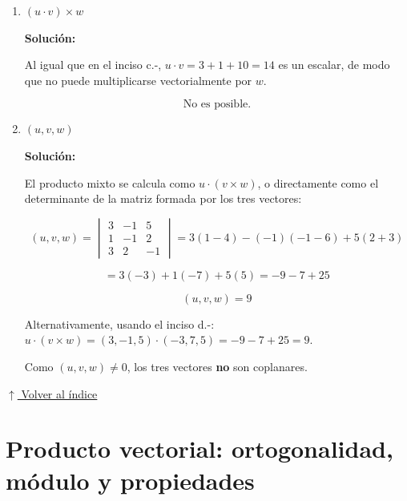 \documentclass[12pt]{article}
\newcommand{\solucion}{%
    \vspace{0.8em}%
    \textbf{Solución:}%
    \vspace{0.8em}%
}
\newcommand{\volverindice}{%
    \vspace{1em}%
    \begin{flushright}%
        \hyperlink{indice}{\small $\uparrow$ Volver al índice}%
    \end{flushright}%
}
\begin{document}
\begin{enumerate}[label=\alph*.-]
    \solucion

    \[
    v\times w=\begin{vmatrix}
    i & j & k\\
    1 & -1 & 2\\
    3 & 2 & -1
    \end{vmatrix}
    =i(1-4)-j(-1-6)+k(2+3)
    \]

    \[
    \boxed{v\times w=(-3,7,5)}
    \]

    \item $(u\cdot v)\times w$

    \solucion

    Al igual que en el inciso c.-, $u\cdot v=3+1+10=14$ es un escalar, de
    modo que no puede multiplicarse vectorialmente por $w$.

    \[
    \boxed{\text{No es posible.}}
    \]

    \item $(u,v,w)$

    \solucion

    El producto mixto se calcula como $u\cdot(v\times w)$, o directamente
    como el determinante de la matriz formada por los tres vectores:

    \[
    (u,v,w)=\begin{vmatrix}
    3 & -1 & 5\\
    1 & -1 & 2\\
    3 & 2 & -1
    \end{vmatrix}
    =3(1-4)-(-1)(-1-6)+5(2+3)
    \]

    \[
    =3(-3)+1(-7)+5(5)=-9-7+25
    \]

    \[
    \boxed{(u,v,w)=9}
    \]

    Alternativamente, usando el inciso d.-:
    $u\cdot(v\times w)=(3,-1,5)\cdot(-3,7,5)=-9-7+25=9$. \checkmark

    Como $(u,v,w)\neq0$, los tres vectores \textbf{no} son coplanares.

\end{enumerate}

\volverindice
\newpage


\section{Producto vectorial: ortogonalidad, módulo y propiedades}
\end{document}
